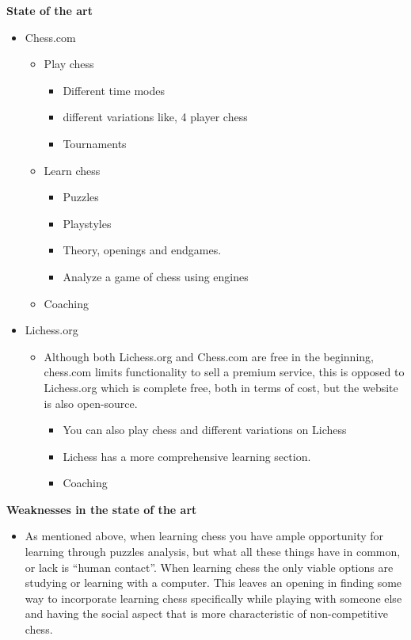 \textbf{State of the art}

\begin{itemize}
    \item Chess.com
    \begin{itemize}
        \item Play chess
        \begin{itemize}
            \item Different time modes
            \item different variations like, 4 player chess
            \item Tournaments
        \end{itemize}
        \item Learn chess
        \begin{itemize}
            \item Puzzles
            \item Playstyles
            \item Theory, openings and endgames.
            \item Analyze a game of chess using engines
        \end{itemize}
        \item Coaching
    \end{itemize}
    \item Lichess.org
    \begin{itemize}
        \item Although both Lichess.org and Chess.com are free in the beginning,
        chess.com limits functionality to sell a premium service,
        this is opposed to Lichess.org which is complete free,
        both in terms of cost, but the website is also open-source.
        \begin{itemize}
            \item You can also play chess and different variations on Lichess
            \item Lichess has a more comprehensive learning section.
            \item Coaching
        \end{itemize}
    \end{itemize}
\end{itemize}

\textbf{Weaknesses in the state of the art}

\begin{itemize}
    \item As mentioned above, when learning chess you have ample opportunity for learning through puzzles analysis,
    but what all these things have in common, or lack is “human contact”.
    When learning chess the only viable options are studying or learning with a computer.
    This leaves an opening in finding some way to incorporate learning chess specifically while playing with someone
    else and having the social aspect that is more characteristic of non-competitive chess.
\end{itemize}

